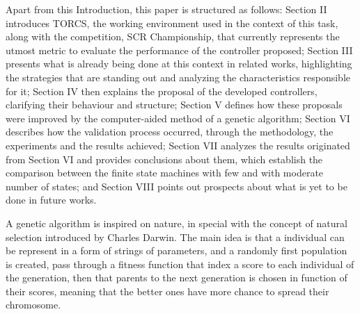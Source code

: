 	Apart from this Introduction, this paper is structured as follows: Section II introduces TORCS, the working
	environment used in the context of this task, along with the competition, SCR Championship, that currently
	represents the utmost metric to evaluate the performance of the controller proposed; Section III presents what is
	already being done at this context in related works, highlighting the strategies that are standing out and
	analyzing the characteristics responsible for it; Section IV then explains the proposal of the developed
	controllers, clarifying their behaviour and structure; Section V defines how these proposals were improved by the
	computer-aided method of a genetic algorithm; Section VI describes how the validation process occurred, through
	the methodology, the experiments and the results achieved; Section VII analyzes the results originated from
	Section VI and provides conclusions about them, which establish the comparison between the finite state machines
	with few and with moderate number of states; and Section VIII points out prospects about what is yet to be done
	in future works.
	
	A genetic algorithm is inspired on nature, in special with the concept of natural selection introduced by Charles
	Darwin. The main idea is that a individual can be represent in a form of strings of parameters, and a randomly
	first population is created, pass through a fitness function that index a score to each individual of the
	generation, then that parents to the next generation is chosen in function of their scores, meaning that the
	better ones have more chance to spread their chromosome. 